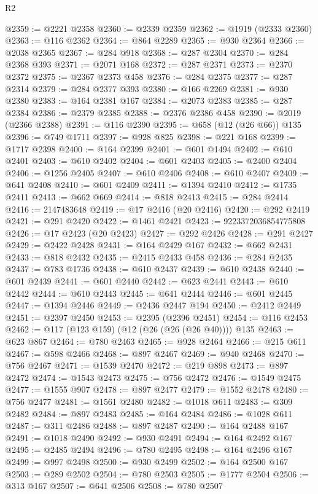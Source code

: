 \begin{lexlean}{R2}
\begin{coremodule}
@2359 := @2221 @2358
@2360 := @2339 @2359
@2362 := @1919 (@2333 @2360)
@2363 := @116 @2362
@2364 := @864 @2289
@2365 := @930 @2364
@2366 := @2038 @2365
@2367 := @284 @918
@2368 := @287 @2304
@2370 := @284 @2368 @393
@2371 := @2071 @168
@2372 := @287 @2371
@2373 := @2370 @2372
@2375 := @2367 @2373 @458
@2376 := @284 @2375
@2377 := @287 @2314
@2379 := @284 @2377 @393
@2380 := @166 @2269
@2381 := @930 @2380
@2383 := @164 @2381 @167
@2384 := @2073 @2383
@2385 := @287 @2384
@2386 := @2379 @2385
@2388 := @2376 @2386 @458
@2390 := @2019 (@2366 @2388)
@2391 := @116 @2390
@2395 := @658 (@12 (@26 @66)) @135
@2396 := @749 @1711
@2397 := @928 @825
@2398 := @221 @168
@2399 := @1717 @2398
@2400 := @164 @2399
@2401 := @601 @1494
@2402 := @610 @2401
@2403 := @610 @2402
@2404 := @601 @2403
@2405 := @2400 @2404
@2406 := @1256 @2405
@2407 := @610 @2406
@2408 := @610 @2407
@2409 := @641 @2408
@2410 := @601 @2409
@2411 := @1394 @2410
@2412 := @1735 @2411
@2413 := @662 @669
@2414 := @818 @2413
@2415 := @284 @2414
@2416 := 2147483648
@2419 := @17 @2416 (@20 @2416)
@2420 := @292 @2419
@2421 := @291 @2420
@2422 := @1461 @2421
@2423 := 9223372036854775808
@2426 := @17 @2423 (@20 @2423)
@2427 := @292 @2426
@2428 := @291 @2427
@2429 := @2422 @2428
@2431 := @164 @2429 @167
@2432 := @662 @2431
@2433 := @818 @2432
@2435 := @2415 @2433 @458
@2436 := @284 @2435
@2437 := @783 @1736
@2438 := @610 @2437
@2439 := @610 @2438
@2440 := @601 @2439
@2441 := @601 @2440
@2442 := @623 @2441
@2443 := @610 @2442
@2444 := @610 @2443
@2445 := @641 @2444
@2446 := @601 @2445
@2447 := @1394 @2446
@2449 := @2436 @2447 @194
@2450 := @2412 @2449
@2451 := @2397 @2450
@2453 := @2395 (@2396 @2451)
@2454 := @116 @2453
@2462 := @117 (@123 @159) (@12 (@26 (@26 (@26 @40)))) @135
@2463 := @623 @867
@2464 := @780 @2463
@2465 := @928 @2464
@2466 := @215 @611
@2467 := @598 @2466
@2468 := @897 @2467
@2469 := @940 @2468
@2470 := @756 @2467
@2471 := @1539 @2470
@2472 := @219 @898
@2473 := @897 @2472
@2474 := @1543 @2473
@2475 := @756 @2472
@2476 := @1549 @2475
@2477 := @1555 @907
@2478 := @897 @2477
@2479 := @1552 @2478
@2480 := @756 @2477
@2481 := @1561 @2480
@2482 := @1018 @611
@2483 := @309 @2482
@2484 := @897 @2483
@2485 := @164 @2484
@2486 := @1028 @611
@2487 := @311 @2486
@2488 := @897 @2487
@2490 := @164 @2488 @167
@2491 := @1018 @2490
@2492 := @930 @2491
@2494 := @164 @2492 @167
@2495 := @2485 @2494
@2496 := @780 @2495
@2498 := @164 @2496 @167
@2499 := @997 @2498
@2500 := @930 @2499
@2502 := @164 @2500 @167
@2503 := @289 @2502
@2504 := @780 @2503
@2505 := @1777 @2504
@2506 := @313 @167
@2507 := @641 @2506
@2508 := @780 @2507

\end{coremodule}
\end{lexlean}
